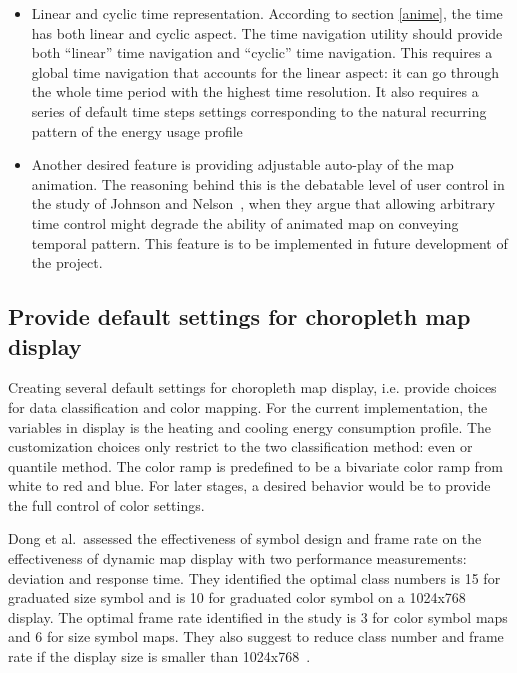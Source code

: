 \begin{itemize}

\item Linear and cyclic time representation. According to section
  \ref{anime}, the time has both linear and cyclic aspect. The time
  navigation utility should provide both ``linear'' time navigation
  and ``cyclic'' time navigation. This requires a global time
  navigation that accounts for the linear aspect: it can go through
  the whole time period with the highest time resolution. It also
  requires a series of default time steps settings corresponding to
  the natural recurring pattern of the energy usage profile
\item Another desired feature is providing adjustable auto-play of the
  map animation. The reasoning behind this is the debatable level of
  user control in the study of Johnson and Nelson~\cite{Nelson1998},
  when they argue that allowing arbitrary time control might degrade
  the ability of animated map on conveying temporal pattern. This
  feature is to be implemented in future development of the project.
\end{itemize}

\subsection{Provide default settings for choropleth map display}
Creating several default settings for choropleth map display,
i.e. provide choices for data classification and color mapping. For
the current implementation, the variables in display is the heating
and cooling energy consumption profile. The customization choices only
restrict to the two classification method: even or quantile
method. The color ramp is predefined to be a bivariate color ramp from
white to red and blue. For later stages, a desired behavior would be
to provide the full control of color settings.


Dong et al.\ assessed the effectiveness of symbol design and frame
rate on the effectiveness of dynamic map display with two performance
measurements: deviation and response time. They identified the optimal
class numbers is 15 for graduated size symbol and is 10 for graduated
color symbol on a 1024x768 display. The optimal frame rate identified
in the study is 3 for color symbol maps and 6 for size symbol
maps. They also suggest to reduce class number and frame rate if the
display size is smaller than
1024x768~\cite{doi:10.1559/1523040639298}. 
